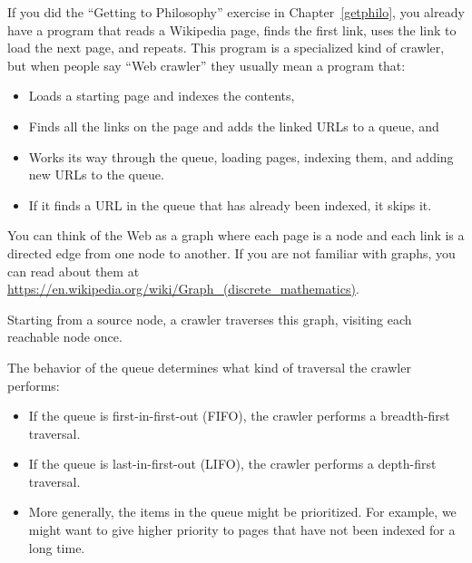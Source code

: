 \documentclass[12pt]{book}
\theoremstyle{exercise}
\begin{document}
If you did the ``Getting to Philosophy'' exercise in
Chapter~\ref{getphilo}, you already have a program that reads a Wikipedia
page, finds the first link, uses the link to load the next page, and
repeats. This program is a specialized kind of crawler, but when
people say ``Web crawler'' they usually mean a program that:

\begin{itemize}

\item
  Loads a starting page and indexes the contents,

\item
  Finds all the links on the page and adds the linked URLs to a queue,
  and

\item
  Works its way through the queue, loading pages, indexing them, and
  adding new URLs to the queue.

\item
  If it finds a URL in the queue that has already been indexed, it skips
  it.

\end{itemize}

You can think of the Web as a graph
where each page is a node and each link is a directed edge from one node
to another. If you are not familiar with graphs, you can read about
them at \url{https://en.wikipedia.org/wiki/Graph_(discrete_mathematics)}.


Starting from a source node, a crawler traverses this graph,
visiting each reachable node once.

The behavior of the queue determines what kind of traversal the crawler
performs:


\begin{itemize}

\item
  If the queue is first-in-first-out (FIFO), the crawler performs a
  breadth-first traversal.

\item
  If the queue is last-in-first-out (LIFO), the crawler performs a
  depth-first traversal.

\item
  More generally, the items in the queue might be prioritized. For
  example, we might want to give higher priority to pages that have not
  been indexed for a long time.

\end{itemize}
\end{document}
